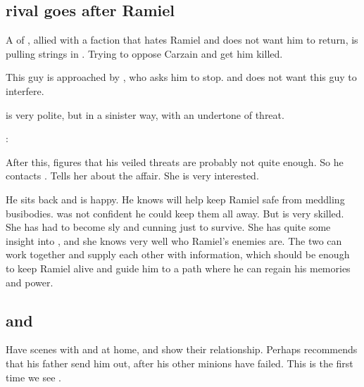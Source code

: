 \begin{garbage}
\subsection{\Mystraacht{} rival goes after Ramiel}
A \resphan{} of \Mystraacht, allied with a faction that hates Ramiel and does not want him to return, is pulling strings in \Redce. 
Trying to oppose Carzain and get him killed. 

This guy is approached by \Azraid, who asks him to stop. 
\Azraid{}  and does not want this guy to interfere. 

\Azraid{} is very polite, but in a sinister way, with an undertone of threat. 

\begin{prose}
  \Azraid:
\end{prose}

After this, \Azraid{} figures that his veiled threats are probably not quite enough. 
So he contacts \Cishiel. 
Tells her about the affair. 
She is very interested. 

He sits back and is happy.
He knows \Cishiel{} will help keep Ramiel safe from meddling \Mystraacht{} busibodies. 
\Azraid{} was not confident he could keep them all away. 
But \Cishiel{} is very skilled. 
She has had to become sly and cunning just to survive. 
She has quite some insight into \Mystraacht, and she knows very well who Ramiel's enemies are. 
The two can work together and supply each other with information, which should be enough to keep Ramiel alive and guide him to a path where he can regain his memories and power. 










\subsection{\Vizsherioch{} and \Secherdamon}
Have scenes with \Vizsherioch{} and \Secherdamon{} at home, and show their relationship. 
Perhaps \Vizsherioch{} recommends that his father send him out, after his other minions have failed. This is the first time we see \Vizsherioch. 








\end{garbage}
